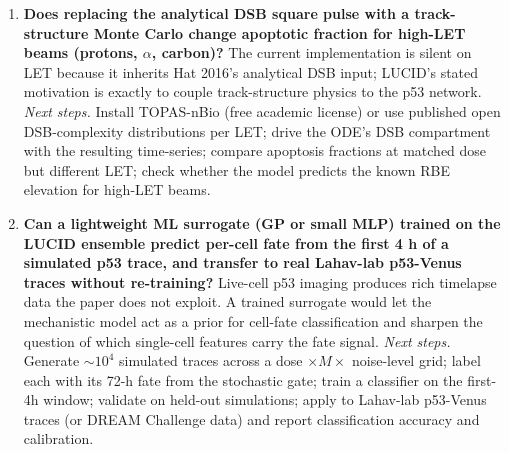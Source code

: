 \begin{enumerate}
  \item \textbf{Does replacing the analytical DSB square pulse with a
        track-structure Monte Carlo change apoptotic fraction for high-LET
        beams (protons, $\alpha$, carbon)?}
        The current implementation is silent on LET because it inherits
        Hat 2016's analytical DSB input; LUCID's stated motivation is exactly
        to couple track-structure physics to the p53 network.
        \emph{Next steps.} Install TOPAS-nBio (free academic license) or use
        published open DSB-complexity distributions per LET; drive the ODE's
        DSB compartment with the resulting time-series; compare apoptosis
        fractions at matched dose but different LET; check whether the model
        predicts the known RBE elevation for high-LET beams.

  \item \textbf{Can a lightweight ML surrogate (GP or small MLP) trained on
        the LUCID ensemble predict per-cell fate from the first 4 h of a
        simulated p53 trace, and transfer to real Lahav-lab p53-Venus traces
        without re-training?}
        Live-cell p53 imaging produces rich timelapse data the paper does not
        exploit. A trained surrogate would let the mechanistic model act as a
        prior for cell-fate classification and sharpen the question of which
        single-cell features carry the fate signal.
        \emph{Next steps.} Generate $\sim 10^4$ simulated traces across a
        dose $\times M \times$ noise-level grid; label each with its 72-h fate
        from the stochastic gate; train a classifier on the first-4h window;
        validate on held-out simulations; apply to Lahav-lab p53-Venus traces
        (or DREAM Challenge data) and report classification accuracy and
        calibration.
\end{enumerate}
